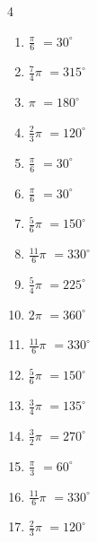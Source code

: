 \begin{multicols}{4}
\begin{enumerate}
\columnbreak %

\resetques

  \item $\displaystyle \frac{\pi}{6}$
        $\displaystyle =30^{\circ}$

  \item $\displaystyle \frac{7}{4}\pi$
        $\displaystyle =315^{\circ}$

  \item $\displaystyle \pi$
        $\displaystyle =180^{\circ}$

  \item $\displaystyle \frac{2}{3}\pi$
        $\displaystyle =120^{\circ}$

  \item $\displaystyle \frac{\pi}{6}$
        $\displaystyle =30^{\circ}$

  \item $\displaystyle \frac{\pi}{6}$
        $\displaystyle =30^{\circ}$

  \item $\displaystyle \frac{5}{6}\pi$
        $\displaystyle =150^{\circ}$

  \item $\displaystyle \frac{11}{6}\pi$
        $\displaystyle =330^{\circ}$

  \item $\displaystyle \frac{5}{4}\pi$
        $\displaystyle =225^{\circ}$

  \item $\displaystyle 2\pi$
        $\displaystyle =360^{\circ}$

  \item $\displaystyle \frac{11}{6}\pi$
        $\displaystyle =330^{\circ}$

  \item $\displaystyle \frac{5}{6}\pi$
        $\displaystyle =150^{\circ}$

  \item $\displaystyle \frac{3}{4}\pi$
        $\displaystyle =135^{\circ}$

  \item $\displaystyle \frac{3}{2}\pi$
        $\displaystyle =270^{\circ}$

  \item $\displaystyle \frac{\pi}{3}$
        $\displaystyle =60^{\circ}$

  \item $\displaystyle \frac{11}{6}\pi$
        $\displaystyle =330^{\circ}$

  \item $\displaystyle \frac{2}{3}\pi$
        $\displaystyle =120^{\circ}$


\end{enumerate}
\end{multicols}
